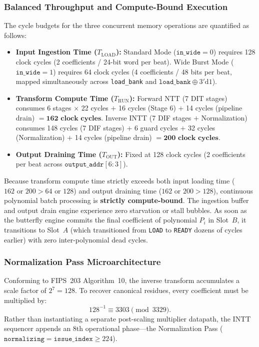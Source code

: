 \subsubsection{Balanced Throughput and Compute-Bound Execution}
The cycle budgets for the three concurrent memory operations are quantified as follows:
\begin{itemize}
    \item \textbf{Input Ingestion Time ($T_{\text{LOAD}}$):} Standard Mode ($\texttt{in\_wide} = 0$) requires 128 clock cycles (2 coefficients / 24-bit word per beat). Wide Burst Mode ($\texttt{in\_wide} = 1$) requires 64 clock cycles (4 coefficients / 48 bits per beat, mapped simultaneously across \texttt{load\_bank} and $\texttt{load\_bank} \oplus 3'\text{d}1$).
    
    \item \textbf{Transform Compute Time ($T_{\text{RUN}}$):} Forward NTT (7 DIT stages) consumes 6 stages $\times$ 22 cycles $+$ 16 cycles (Stage 6) $+$ 14 cycles (pipeline drain) $= \mathbf{162\text{ clock cycles}}$. Inverse INTT (7 DIF stages $+$ Normalization) consumes 148 cycles (7 DIF stages) $+$ 6 guard cycles $+$ 32 cycles (Normalization) $+$ 14 cycles (pipeline drain) $= \mathbf{200\text{ clock cycles}}$.
    
    \item \textbf{Output Draining Time ($T_{\text{OUT}}$):} Fixed at 128 clock cycles (2 coefficients per beat across $\texttt{output\_addr}[6:3]$).
\end{itemize}

Because transform compute time strictly exceeds both input loading time ($162 \text{ or } 200 > 64 \text{ or } 128$) and output draining time ($162 \text{ or } 200 > 128$), continuous polynomial batch processing is \textbf{strictly compute-bound}. The ingestion buffer and output drain engine experience zero starvation or stall bubbles. As soon as the butterfly engine commits the final coefficient of polynomial $P_i$ in Slot~$B$, it transitions to Slot~$A$ (which transitioned from \texttt{LOAD} to \texttt{READY} dozens of cycles earlier) with zero inter-polynomial dead cycles.

\subsubsection{Normalization Pass Microarchitecture}
Conforming to FIPS~203 Algorithm~10, the inverse transform accumulates a scale factor of $2^7 = 128$. To recover canonical residues, every coefficient must be multiplied by:
\begin{equation}
\label{eq:inv_scale}
128^{-1} \equiv 3303 \pmod{3329}.
\end{equation}
Rather than instantiating a separate post-scaling multiplier datapath, the INTT sequencer appends an 8th operational phase---the Normalization Pass ($\texttt{normalizing} = \texttt{issue\_index} \ge 224$).


